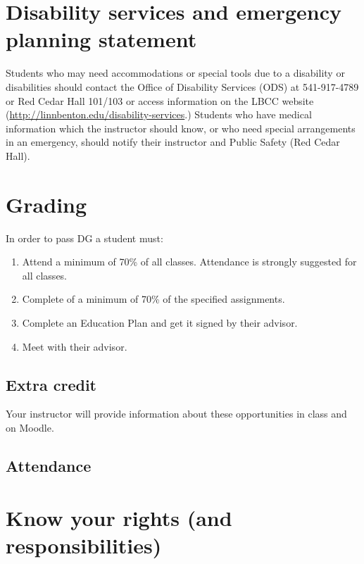 \documentclass[12pt,article,oneside]{memoir}
\begin{document}
\section{Disability services and emergency planning statement}

Students who may need accommodations or special tools due to a disability or disabilities should contact the Office of Disability Services (ODS) at 541-917-4789 or Red Cedar Hall 101/103 or access information on the LBCC website (\url{http://linnbenton.edu/disability-services}.) Students who have medical information which the instructor should know, or who need special arrangements in an emergency, should notify their instructor and Public Safety (Red Cedar Hall).

\section{Grading}

In order to pass DG a student must:

\begin{enumerate}
 \item Attend a minimum of 70\% of all classes.  Attendance is strongly suggested for all classes.
 \item Complete of a minimum of 70\% of the specified assignments.
 \item Complete an Education Plan and get it signed by their advisor.
 \item Meet with their advisor.
\end{enumerate}
  

\subsection{Extra credit}
Your instructor will provide information about these opportunities in class and on Moodle.


\subsection{Attendance}


\section{Know your rights (and responsibilities)}
\end{document}
